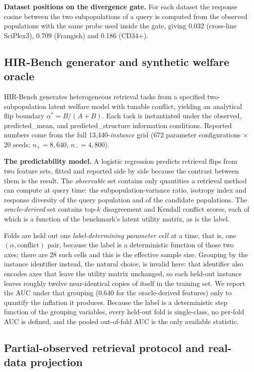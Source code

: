 \documentclass[11pt,letterpaper]{article}
\begin{document}
\textbf{Dataset positions on the divergence gate.} For each dataset the response cosine
between the two subpopulations of a query is computed from the observed populations with the
same probe used inside the gate, giving 0.032 (cross-line SciPlex3), 0.709 (Frangieh) and
0.186 (CD34$+$).

\subsection*{HIR-Bench generator and synthetic welfare oracle}

HIR-Bench generates heterogeneous retrieval tasks from a specified two-subpopulation latent
welfare model with tunable conflict, yielding an analytical flip boundary
$\alpha^* = B/(A+B)$. Each task is instantiated under the observed, predicted\_mean, and
predicted\_structure information conditions. Reported numbers come from the full
13,440-\emph{instance} grid (672 parameter configurations $\times$ 20 seeds; $n_{+} = 8{,}640$,
$n_{-} = 4{,}800$).

\textbf{The predictability model.} A logistic regression predicts retrieval flips from two
feature sets, fitted and reported side by side because the contrast between them is the
result. The \emph{observable} set contains only quantities a retrieval method can compute at
query time: the subpopulation-variance ratio, isotropy index and response diversity of the
query population and of the candidate populations. The \emph{oracle-derived} set
contains top-$k$ disagreement and Kendall conflict scores, each of which is a function of the
benchmark's latent utility matrix, as is the label.

Folds are held out one \emph{label-determining parameter cell} at a time, that is, one
$(\alpha, \mathrm{conflict})$ pair, because the label is a deterministic function of those
two axes; there are 28 such cells and this is the effective sample size. Grouping by the instance identifier instead, the natural choice, is invalid here: that
identifier also encodes axes that leave the utility matrix unchanged, so each held-out instance leaves
roughly twelve near-identical copies of itself in the training set. We report the AUC under
that grouping (0.640 for the oracle-derived features) only to quantify the inflation it
produces. Because the label is a deterministic step function of the grouping variables,
every held-out fold is single-class, no per-fold AUC is defined, and the pooled out-of-fold
AUC is the only available statistic.

\subsection*{Partial-observed retrieval protocol and real-data projection}
\end{document}
